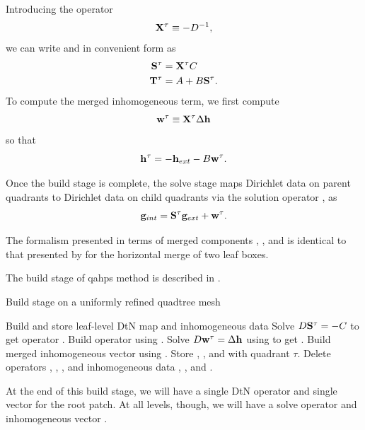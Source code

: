 Introducing  the operator
\begin{equation}
\mathbf X^{\tau} \equiv -D^{-1},
\label{eq:xtau}
\end{equation}
we can write \Ttau and \Stau in convenient form as
\begin{equation}
\begin{aligned}
\mathbf S^{\tau} & = \mathbf X^{\tau} C \\
\mathbf T^{\tau} & = A + B\mathbf S^{\tau}.
\end{aligned}
\end{equation}
To compute the merged inhomogeneous term, we first compute
\begin{equation}
\mathbf w^{\tau} \equiv \mathbf X^{\tau}\Delta \mathbf h
\label{eq:wtau-merged}
\end{equation}
so that
\begin{equation}
\mathbf h^{\tau} = -\mathbf h_{ext} - B\mathbf w^{\tau}.
\label{eq:htau}
\end{equation}

Once the build stage is complete, the solve stage maps Dirichlet data on parent quadrants to Dirichlet data on child quadrants via the solution operator \Stau, as
\begin{equation}
\mathbf g_{int} = \mathbf S^{\tau} \mathbf g_{ext} + \mathbf w^{\tau}.
\label{eq:solve_eqn}
\end{equation}

The formalism presented in terms of merged components \Xtau, \Stau, \Ttau and \htau is identical to that presented by \cite{gillman2014direct} for the horizontal merge of two leaf boxes.

The build stage of \gls{qahps} method is described in .
\begin{algorithm}[H]
    \caption{Build stage on a uniformly refined quadtree mesh}
    \begin{algorithmic}[0]
         
                \State Build and store leaf-level DtN map \Ttau and inhomogeneous data \htau
            \Else {}
                \State Solve $D\mathbf S^{\tau} = -C$ to get operator \Stau. 
                \State Build operator \Ttau using .
                \State Solve $D\mathbf w^{\tau} = \Delta \mathbf h$ using to get \wtau.  
                \State Build merged inhomogeneous vector \htau using .
                \State Store \Stau, \Ttau, \htau and \wtau with quadrant $\tau$.
                \State Delete operators \Talpha, \Tbeta, \Tgamma, \Tomega and inhomogeneous data \halpha, \hbeta, \hgamma and \homega.
            \EndIf
        \EndFor
    \end{algorithmic}
    \label{alg:build_merge_uniform}
\end{algorithm}
At the end of this build stage, we will have a single DtN operator \Ttau and single vector \htau for the root patch.  At all levels, though, we will have a solve operator \Stau and inhomogeneous vector \wtau.

